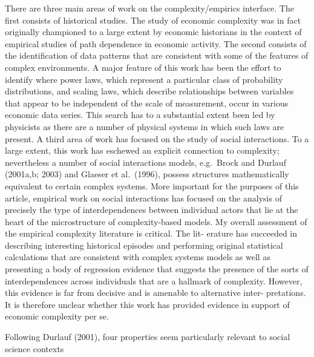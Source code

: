 \documentclass[
]{book}
\begin{document}
There are three main areas of work on the complexity/empirics interface.
The first consists of historical studies. The study of economic complexity was in fact
originally championed to a large extent by economic historians in the context of
empirical studies of path dependence in economic activity. The second consists of
the identification of data patterns that are consistent with some of the features of
complex environments. A major feature of this work has been the effort to identify
where power laws, which represent a particular class of probability distributions,
and scaling laws, which describe relationships between variables that appear to be
independent of the scale of measurement, occur in various economic data series.
This search has to a substantial extent been led by physicists as there are a number
of physical systems in which such laws are present. A third area of work has focused
on the study of social interactions. To a large extent, this work has eschewed an
explicit connection to complexity; nevertheless a number of social interactions
models, e.g.~Brock and Durlauf (2001a,b; 2003) and Glaeser et al.~(1996), possess
structures mathematically equivalent to certain complex systems. More important
for the purposes of this article, empirical work on social interactions has focused
on the analysis of precisely the type of interdependences between individual actors
that lie at the heart of the microstructure of complexity-based models.
My overall assessment of the empirical complexity literature is critical. The lit-
erature has succeeded in describing interesting historical episodes and performing
original statistical calculations that are consistent with complex systems models as
well as presenting a body of regression evidence that suggests the presence of the
sorts of interdependences across individuals that are a hallmark of complexity.
However, this evidence is far from decisive and is amenable to alternative inter-
pretations. It is therefore unclear whether this work has provided evidence in
support of economic complexity per se.

Following Durlauf
(2001), four properties seem particularly relevant to social science contexts
\end{document}
